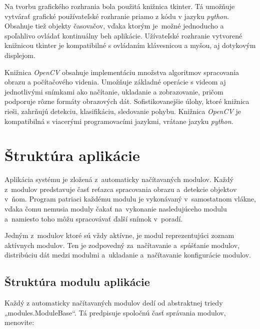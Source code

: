         Na tvorbu grafického rozhrania bola použitá knižnica \ac{tkinter}. Tá umožňuje vytvárať grafické používateľské rozhranie priamo z kódu v jazyku \emph{python}. Obsahuje tiež objekty časovačov, vďaka ktorým je~možné jednoducho a spoľahlivo ovládať kontinuálny beh aplikácie. Užívateľské rozhranie vytvorené knižnicou \ac{tkinter} je kompatibilné s ovládaním klávesnicou a myšou, aj dotykovým displejom.

        Knižnica \emph{OpenCV} obsahuje implementáciu množstva algoritmov spracovania obrazu a počítačového videnia. Umožňuje základné operácie s videom aj jednotlivými snímkami ako načítanie, ukladanie a zobrazovanie, pričom podporuje rôzne formáty obrazových dát. Sofistikovanejšie úlohy, ktoré knižnica rieši, zahrňujú detekciu, klasifikáciu, sledovanie pohybu. Knižnica \emph{OpenCV} je kompatibilná s viacerými programovacími jazykmi, vrátane jazyku \emph{python}.

    \section{Štruktúra aplikácie}
        Aplikácia systému je zložená z~automaticky načítavaných modulov. Každý z~modulov predstavuje časť reťazca spracovania obrazu a~detekcie objektov v~ňom. Program patriaci každému modulu je vykonávaný v~samostatnom vlákne, vďaka čomu nemusia moduly čakať na~vykonanie nasledujúceho modulu a~namiesto toho môžu spracovávať ďalší snímok v~poradí.

        Jedným z~modulov ktoré sú vždy aktívne, je modul reprezentujúci zoznam aktívnych modulov. Ten je zodpovedný za~načítavanie a~spúšťanie modulov, distribúciu dát medzi modulmi a~ukladanie a~načítavanie konfigurácie modulov.
        \subsection{Štruktúra modulu aplikácie}
            Každý z automaticky načítavaných modulov dedí od abstraktnej triedy „modules.ModuleBase“. Tá predpisuje spoločnú časť správania modulov, menovite:

